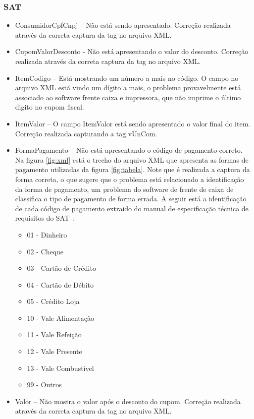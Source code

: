 \documentclass{article}      %
\begin{document}
\subsubsection{SAT}
\begin{itemize}
\item ConsumidorCpfCnpj – Não está sendo apresentado. Correção realizada através da correta captura da tag no arquivo XML.
\item CupomValorDesconto - Não está apresentando o valor do desconto. Correção realizada através da correta captura da tag no arquivo XML.
\item ItemCodigo – Está mostrando um número a mais no código. O campo no arquivo XML está vindo um dígito a mais, o problema provavelmente está associado ao software frente caixa e impressora, que não imprime o último digito no cupom fiscal.
\item ItemValor – O campo ItemValor está sendo apresentado o valor final do item. Correção realizada capturando a tag vUnCom.
\item FormaPagamento – Não está apresentando o código de pagamento correto. Na figura \ref{fig:xml} está o trecho do arquivo XML que apresenta as formas de pagamento utilizadas da figura \ref{fig:tabela}. Note que é realizada a captura da forma correta, o que sugere que o problema está relacionado a identificação da forma de pagamento, um problema do software de frente de caixa de classifica o tipo de pagamento de forma errada. A seguir está a identificação de cada código de pagamento extraído do manual de especificação técnica de requisitos do SAT~\cite{sat}: 

\begin{itemize}
\item 01 - Dinheiro
\item 02 - Cheque
\item 03 - Cartão de Crédito
\item 04 - Cartão de Débito
\item 05 - Crédito Loja
\item 10 - Vale Alimentação
\item 11 - Vale Refeição
\item 12 - Vale Presente
\item 13 - Vale Combustível
\item 99 - Outros
\end{itemize}

\item Valor – Não mostra o valor após o desconto do cupom. Correção realizada através da correta captura da tag no arquivo XML.
\end{itemize}
\end{document}
